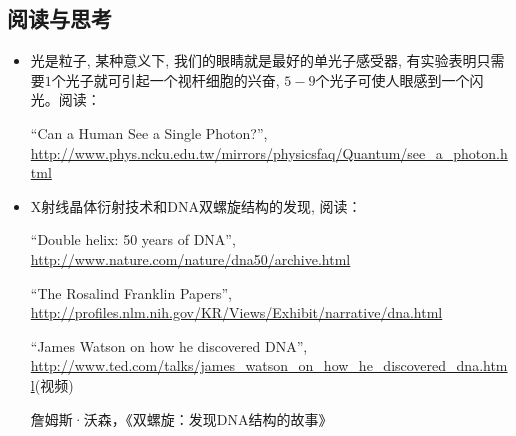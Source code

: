 \subsection*{阅读与思考}


\begin{itemize}

\item 光是粒子, 某种意义下, 我们的眼睛就是最好的单光子感受器,
有实验表明只需要$1$个光子就可引起一个视杆细胞的兴奋,
$5-9$个光子可使人眼感到一个闪光。阅读：

``Can a Human See a Single Photon?'',
\url{http://www.phys.ncku.edu.tw/mirrors/physicsfaq/Quantum/see_a_photon.html}


\item X射线晶体衍射技术和DNA双螺旋结构的发现, 阅读：


``Double helix: 50 years of DNA'',
\url{http://www.nature.com/nature/dna50/archive.html}


``The Rosalind Franklin Papers'',
\url{http://profiles.nlm.nih.gov/KR/Views/Exhibit/narrative/dna.html}

``James Watson on how he discovered DNA'',
\url{http://www.ted.com/talks/james_watson_on_how_he_discovered_dna.html}(视频)

詹姆斯·沃森，《双螺旋：发现DNA结构的故事》


\end{itemize}
